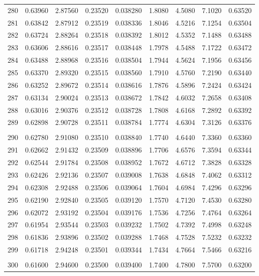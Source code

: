 \documentclass[letter,twosides,10pt]{article}
\begin{document}
\begin{longtable}{|c|c|c|c|c|c|c|c|c|}
280 & 0.63960 & 2.87560 & 0.23520 & 0.038280 & 1.8080 & 4.5080 & 7.1020 & 0.63520 \\
281 & 0.63842 & 2.87912 & 0.23519 & 0.038336 & 1.8046 & 4.5216 & 7.1254 & 0.63504 \\
282 & 0.63724 & 2.88264 & 0.23518 & 0.038392 & 1.8012 & 4.5352 & 7.1488 & 0.63488 \\
283 & 0.63606 & 2.88616 & 0.23517 & 0.038448 & 1.7978 & 4.5488 & 7.1722 & 0.63472 \\
284 & 0.63488 & 2.88968 & 0.23516 & 0.038504 & 1.7944 & 4.5624 & 7.1956 & 0.63456 \\
285 & 0.63370 & 2.89320 & 0.23515 & 0.038560 & 1.7910 & 4.5760 & 7.2190 & 0.63440 \\
286 & 0.63252 & 2.89672 & 0.23514 & 0.038616 & 1.7876 & 4.5896 & 7.2424 & 0.63424 \\
287 & 0.63134 & 2.90024 & 0.23513 & 0.038672 & 1.7842 & 4.6032 & 7.2658 & 0.63408 \\
288 & 0.63016 & 2.90376 & 0.23512 & 0.038728 & 1.7808 & 4.6168 & 7.2892 & 0.63392 \\
289 & 0.62898 & 2.90728 & 0.23511 & 0.038784 & 1.7774 & 4.6304 & 7.3126 & 0.63376 \\
 & & & & & & & & \\
290 & 0.62780 & 2.91080 & 0.23510 & 0.038840 & 1.7740 & 4.6440 & 7.3360 & 0.63360 \\
291 & 0.62662 & 2.91432 & 0.23509 & 0.038896 & 1.7706 & 4.6576 & 7.3594 & 0.63344 \\
292 & 0.62544 & 2.91784 & 0.23508 & 0.038952 & 1.7672 & 4.6712 & 7.3828 & 0.63328 \\
293 & 0.62426 & 2.92136 & 0.23507 & 0.039008 & 1.7638 & 4.6848 & 7.4062 & 0.63312 \\
294 & 0.62308 & 2.92488 & 0.23506 & 0.039064 & 1.7604 & 4.6984 & 7.4296 & 0.63296 \\
295 & 0.62190 & 2.92840 & 0.23505 & 0.039120 & 1.7570 & 4.7120 & 7.4530 & 0.63280 \\
296 & 0.62072 & 2.93192 & 0.23504 & 0.039176 & 1.7536 & 4.7256 & 7.4764 & 0.63264 \\
297 & 0.61954 & 2.93544 & 0.23503 & 0.039232 & 1.7502 & 4.7392 & 7.4998 & 0.63248 \\
298 & 0.61836 & 2.93896 & 0.23502 & 0.039288 & 1.7468 & 4.7528 & 7.5232 & 0.63232 \\
299 & 0.61718 & 2.94248 & 0.23501 & 0.039344 & 1.7434 & 4.7664 & 7.5466 & 0.63216 \\
 & & & & & & & & \\
300 & 0.61600 & 2.94600 & 0.23500 & 0.039400 & 1.7400 & 4.7800 & 7.5700 & 0.63200 \\

\end{longtable}
\end{document}
